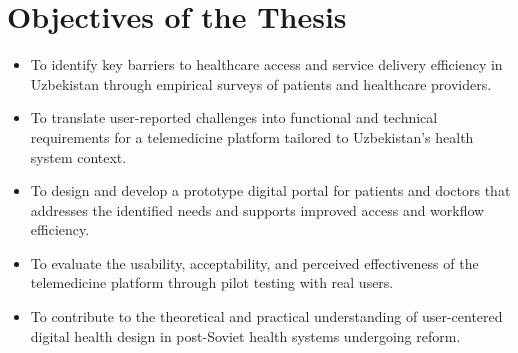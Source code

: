 \section{Objectives of the Thesis}\label{objectives-of-the-thesis}

\begin{itemize}
\item
  To identify key barriers to healthcare access and service delivery
  efficiency in Uzbekistan through empirical surveys of patients and
  healthcare providers.
\item
  To translate user-reported challenges into functional and technical
  requirements for a telemedicine platform tailored to Uzbekistan's
  health system context.
\item
  To design and develop a prototype digital portal for patients and
  doctors that addresses the identified needs and supports improved
  access and workflow efficiency.
\item
  To evaluate the usability, acceptability, and perceived effectiveness
  of the telemedicine platform through pilot testing with real users.
\item
  To contribute to the theoretical and practical understanding of
  user-centered digital health design in post-Soviet health systems
  undergoing reform.
\end{itemize}

